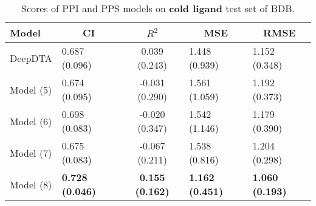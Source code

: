 \begin{table}
\centering
\caption{Scores of PPI and PPS models on \textbf{cold ligand} test set of BDB.}
\label{tab:ddi_ci_r2}
\begin{tabular}{|l|l|c|l|l|} 
\hline
Model & \multicolumn{1}{c|}{CI} & $R^2$ & \multicolumn{1}{c|}{MSE} & \multicolumn{1}{c|}{RMSE} \\ 
\hline
DeepDTA & 0.687 (0.096) & 0.039 (0.243) & 1.448 (0.939) & 1.152 (0.348) \\ 
\hline
Model (5) & 0.674 (0.095) & -0.031 (0.290) & 1.561 (1.059) & 1.192 (0.373) \\ 
\hline
Model (6) & 0.698 (0.083) & -0.020 (0.347) & 1.542 (1.146) & 1.179 (0.390) \\ 
\hline
Model (7) & 0.675 (0.083) & -0.067 (0.211) & 1.538 (0.816) & 1.204 (0.298) \\ 
\hline
Model (8) & \textbf{0.728 (0.046)} & \textbf{0.155 (0.162)} & \textbf{1.162 (0.451)} & \textbf{1.060 (0.193)} \\
\hline
\end{tabular}
\label{tab:ppi_vs_pps_cold_ligand}
\end{table}